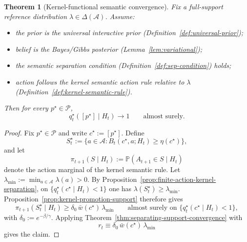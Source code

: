 \documentclass[11pt]{article}
\newtheorem{theorem}{Theorem}[section]
\theoremstyle{definition}
\theoremstyle{remark}
\newcommand{\Acal}{\mathcal{A}}
\newcommand{\Pcal}{\mathcal{P}}
\newcommand{\Prob}{\mathbb{P}}
\begin{document}
\begin{theorem}[Kernel-functional semantic convergence]
\label{thm:kernel-semantic-convergence}
Fix a full-support reference distribution $\lambda\in\Delta(\Acal)$. Assume:
\begin{itemize}
\item[(C1)] the prior is the universal interactive prior (Definition~\ref{def:universal-prior});
\item[(C2)] belief is the Bayes/Gibbs posterior (Lemma~\ref{lem:variational});
\item[(C3)] the semantic separation condition (Definition~\ref{def:sep-condition}) holds;
\item[(K4)] action follows the kernel semantic action rule relative to $\lambda$ (Definition~\ref{def:kernel-semantic-rule}).
\end{itemize}
Then for every $p^\star\in\Pcal$,
\[
q_t^\star([p^\star]\mid H_t)\longrightarrow 1
\qquad
\text{almost surely.}
\]
\end{theorem}

\begin{proof}
Fix $p^\star\in\Pcal$ and write $c^\star:=[p^\star]$. Define
\[
S_t^\star:=\{a\in\Acal:B_t(c^\star,a;H_t)\ge \eta(c^\star)\},
\]
and let
\[
\pi_{t+1}(S\mid H_t):=\Prob(A_{t+1}\in S\mid H_t)
\]
denote the action marginal of the kernel semantic rule. Let $\lambda_{\min}:=\min_{a\in\Acal}\lambda(a)>0$. By Proposition~\ref{prop:finite-action-kernel-separation}, on $\{q_t^\star(c^\star\mid H_t)<1\}$ one has $\lambda(S_t^\star)\ge \lambda_{\min}$. Proposition~\ref{prop:kernel-promotion-support} therefore gives
\[
\pi_{t+1}(S_t^\star\mid H_t)\ge \delta_0\,\bar w(c^\star)\,\lambda_{\min}
\qquad\text{almost surely on }\{q_t^\star(c^\star\mid H_t)<1\},
\]
with $\delta_0:=e^{-\beta/\gamma}$. Applying Theorem~\ref{thm:separating-support-convergence} with
\[
r_t\equiv \delta_0\,\bar w(c^\star)\,\lambda_{\min}
\]
gives the claim.
\end{proof}
\end{document}
